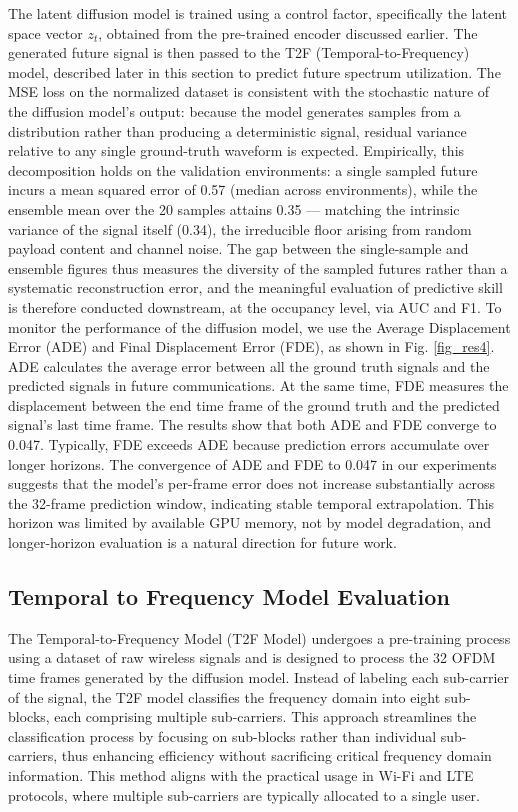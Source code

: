 \documentclass[lettersize,journal]{IEEEtran}
\begin{document}
The latent diffusion model is trained using a control factor, specifically the latent space vector $z_t$, obtained from the pre-trained encoder discussed earlier. The generated future signal is then passed to the T2F (Temporal-to-Frequency) model, described later in this section to predict future spectrum utilization. The MSE loss on the normalized dataset is consistent with the stochastic nature of the diffusion model's output: because the model generates samples from a distribution rather than producing a deterministic signal, residual variance relative to any single ground-truth waveform is expected. Empirically, this decomposition holds on the validation environments: a single sampled future incurs a mean squared error of 0.57 (median across environments), while the ensemble mean over the 20 samples attains 0.35 — matching the intrinsic variance of the signal itself (0.34), the irreducible floor arising from random payload content and channel noise. The gap between the single-sample and ensemble figures thus measures the diversity of the sampled futures rather than a systematic reconstruction error, and the meaningful evaluation of predictive skill is therefore conducted downstream, at the occupancy level, via AUC and F1. To monitor the performance of the diffusion model, we use the Average Displacement Error (ADE) and Final Displacement Error (FDE), as shown in Fig. \ref{fig_res4}. ADE calculates the average error between all the ground truth signals and the predicted signals in future communications. At the same time, FDE measures the displacement between the end time frame of the ground truth and the predicted signal's last time frame. The results show that both ADE and FDE converge to 0.047. Typically, FDE exceeds ADE because prediction errors accumulate over longer horizons. The convergence of ADE and FDE to 0.047 in our experiments suggests that the model's per-frame error does not increase substantially across the 32-frame prediction window, indicating stable temporal extrapolation. This horizon was limited by available GPU memory, not by model degradation, and longer-horizon evaluation is a natural direction for future work.

\subsection{Temporal to Frequency Model Evaluation}
The Temporal-to-Frequency Model (T2F Model) undergoes a pre-training process using a dataset of raw wireless signals and is designed to process the 32 OFDM time frames generated by the diffusion model. Instead of labeling each sub-carrier of the signal, the T2F model classifies the frequency domain into eight sub-blocks, each comprising multiple sub-carriers. This approach streamlines the classification process by focusing on sub-blocks rather than individual sub-carriers, thus enhancing efficiency without sacrificing critical frequency domain information. This method aligns with the practical usage in Wi-Fi and LTE protocols, where multiple sub-carriers are typically allocated to a single user.
\end{document}

